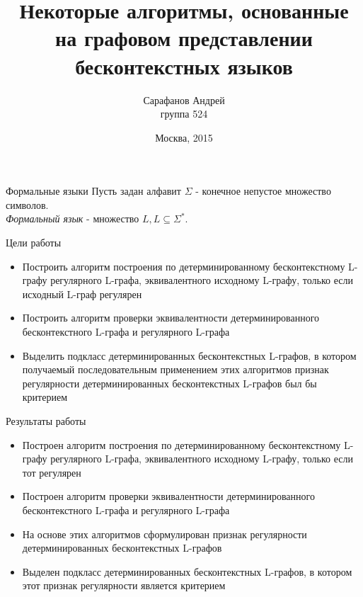 \documentclass{beamer}
\title {Некоторые алгоритмы, основанные на графовом представлении бесконтекстных языков}
\author {Сарафанов Андрей \\ \small{группа 524}}
\institute {\small{
  Научный руководитель:\\
  к.ф.-м.н. Вылиток Алексей Александрович\\
}}
\date {\footnotesize{Москва, 2015}}
\begin{document}
\begin{frame}
  \titlepage
\end{frame}

\begin{frame} {Формальные языки}
Пусть задан алфавит $\Sigma$ - конечное непустое множество символов.\\
\textit{Формальный язык} - множество $L, L\subseteq \Sigma^*$.
\end{frame}

\begin{frame} {Цели работы}
\begin{itemize}
  \item Построить алгоритм построения по детерминированному бесконтекстному L-графу регулярного L-графа, эквивалентного исходному L-графу, только если исходный L-граф регулярен
  \item Построить алгоритм проверки эквивалентности детерминированного бесконтекстного L-графа и регулярного L-графа
  \item Выделить подкласс детерминированных бесконтекстных L-графов, в котором получаемый последовательным применением этих алгоритмов признак регулярности детерминированных бесконтекстных L-графов был бы критерием
\end{itemize}
\end{frame}

\begin{frame} {Результаты работы}
\begin{itemize}
  \item Построен алгоритм построения по детерминированному бесконтекстному L-графу регулярного L-графа, эквивалентного исходному  L-графу, только если тот регулярен
  \item Построен алгоритм проверки эквивалентности детерминированного бесконтекстного L-графа и регулярного L-графа
  \item На основе этих алгоритмов сформулирован признак регулярности детерминированных бесконтекстных L-графов
  \item Выделен подкласс детерминированных бесконтекстных L-графов, в котором этот признак регулярности является критерием
\end{itemize}
\end{frame}
\end{document}
